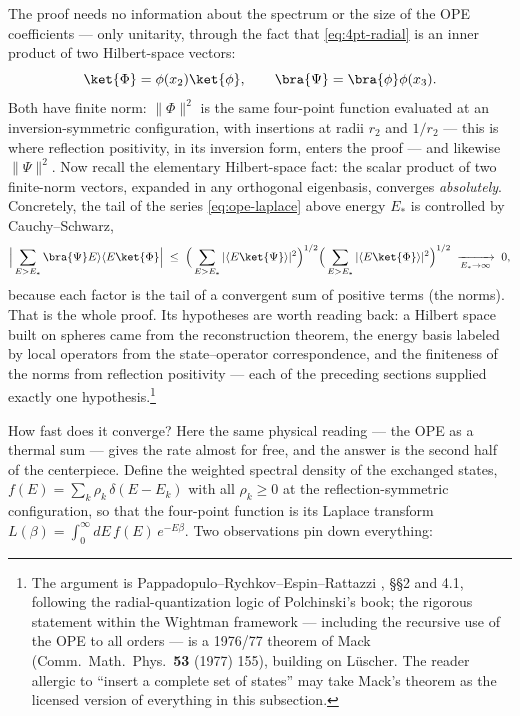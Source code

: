 The proof needs no information about the spectrum or the size of the OPE
coefficients --- only unitarity, through the fact that \eqref{eq:4pt-radial}
is an inner product of two Hilbert-space vectors:
\begin{equation}
\ket{\Phi} = \phi(x_2)\ket{\phi}, \qquad
\bra{\Psi} = \bra{\phi}\phi(x_3) .
\end{equation}
Both have finite norm: $\|\Phi\|^2$ is the same four-point function evaluated
at an inversion-symmetric configuration, with insertions at radii $r_2$ and
$1/r_2$ --- this is where reflection positivity, in its inversion form,
enters the proof --- and likewise $\|\Psi\|^2$. Now recall the elementary
Hilbert-space fact: the
scalar product of two finite-norm vectors, expanded in any orthogonal
eigenbasis, converges \emph{absolutely}. Concretely, the tail of the series
\eqref{eq:ope-laplace} above energy $E_*$ is controlled by Cauchy--Schwarz,
\begin{equation}
\Big| \sum_{E > E_*} \bra{\Psi}E\rangle\langle E\ket{\Phi} \Big|
\;\le\;
\Big(\sum_{E > E_*} |\langle E\ket{\Psi}\rangle|^2\Big)^{1/2}
\Big(\sum_{E > E_*} |\langle E\ket{\Phi}\rangle|^2\Big)^{1/2}
\;\xrightarrow[E_* \to \infty]{}\; 0,
\label{eq:cauchy-schwarz-tail}
\end{equation}
because each factor is the tail of a convergent sum of positive terms (the
norms). That is the whole proof. Its hypotheses are worth reading back: a
Hilbert space built on spheres came from the reconstruction theorem, the
energy basis labeled by local operators from the state--operator
correspondence, and the finiteness of the norms from reflection positivity
--- each of the preceding sections supplied exactly one
hypothesis.\footnote{The argument
is Pappadopulo--Rychkov--Espin--Rattazzi , \S\S2 and 4.1,
following the radial-quantization logic of Polchinski's book; the rigorous
statement within the Wightman framework --- including the recursive use of
the OPE to all orders --- is a 1976/77 theorem of Mack (Comm.\ Math.\ Phys.\
\textbf{53} (1977) 155), building on L\"uscher. The reader allergic to
``insert a complete set of states'' may take Mack's theorem as the licensed
version of everything in this subsection.}

How fast does it converge? Here the same physical reading --- the OPE as a
thermal sum --- gives the rate almost for free, and the answer is the second
half of the centerpiece. Define the weighted spectral density of the exchanged
states, $f(E) = \sum_k \rho_k\, \delta(E - E_k)$ with all $\rho_k \ge 0$ at the
reflection-symmetric configuration, so that the four-point function is its
Laplace transform $L(\beta) = \int_0^\infty dE\, f(E)\, e^{-E\beta}$. Two
observations pin down everything:

